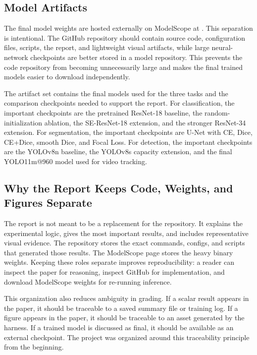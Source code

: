 \documentclass[10pt,twocolumn]{article}
\begin{document}
\subsection{Model Artifacts}

The final model weights are hosted externally on ModelScope at . This separation is intentional. The GitHub repository should contain source code, configuration files, scripts, the report, and lightweight visual artifacts, while large neural-network checkpoints are better stored in a model repository. This prevents the code repository from becoming unnecessarily large and makes the final trained models easier to download independently.

The artifact set contains the final models used for the three tasks and the comparison checkpoints needed to support the report. For classification, the important checkpoints are the pretrained ResNet-18 baseline, the random-initialization ablation, the SE-ResNet-18 extension, and the stronger ResNet-34 extension. For segmentation, the important checkpoints are U-Net with CE, Dice, CE+Dice, smooth Dice, and Focal Loss. For detection, the important checkpoints are the YOLOv8n baseline, the YOLOv8s capacity extension, and the final YOLO11m@960 model used for video tracking.

\subsection{Why the Report Keeps Code, Weights, and Figures Separate}

The report is not meant to be a replacement for the repository. It explains the experimental logic, gives the most important results, and includes representative visual evidence. The repository stores the exact commands, configs, and scripts that generated those results. The ModelScope page stores the heavy binary weights. Keeping these roles separate improves reproducibility: a reader can inspect the paper for reasoning, inspect GitHub for implementation, and download ModelScope weights for re-running inference.

This organization also reduces ambiguity in grading. If a scalar result appears in the paper, it should be traceable to a saved summary file or training log. If a figure appears in the paper, it should be traceable to an asset generated by the harness. If a trained model is discussed as final, it should be available as an external checkpoint. The project was organized around this traceability principle from the beginning.
\end{document}

